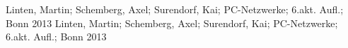  Linten, Martin; Schemberg, Axel; Surendorf, Kai; PC-Netzwerke; 6.akt. Aufl.; Bonn 2013
 Linten, Martin; Schemberg, Axel; Surendorf, Kai; PC-Netzwerke; 6.akt. Aufl.; Bonn 2013